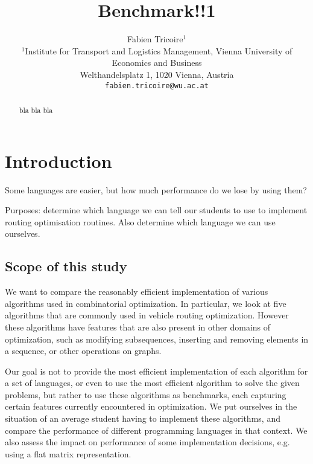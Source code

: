 \documentclass[11pt,a4paper,notitlepage]{article}
\begin{document}
\title{Benchmark!!1}
\author{
Fabien Tricoire$^{1}$ \\[1ex]
 \small $^1$Institute for Transport and Logistics Management,
 Vienna University of Economics and Business\\
 \small Welthandelsplatz 1, 1020 Vienna, Austria\\
  \small \texttt{fabien.tricoire@wu.ac.at}\\[2ex]
}
\date{}
\maketitle

\begin{abstract}
  bla bla bla
\end{abstract}

\section{Introduction}
\label{sec:intro}

Some languages are easier, but how much performance do we lose by
using them?

Purposes: determine which language we can tell our students to
use to implement routing optimisation routines. Also determine which
language we can use ourselves.

\subsection{Scope of this study}
We want to compare the reasonably efficient implementation of various
algorithms used in combinatorial optimization. In particular, we look
at five algorithms that are commonly used in vehicle routing
optimization. However these algorithms have features that are also
present in other domains of optimization, such as modifying
subsequences, inserting and removing elements in a sequence, or other
operations on graphs.

Our goal is not to provide the most efficient implementation of each
algorithm for a set of languages, or even to use the most efficient
algorithm to solve the given problems, but rather to use these
algorithms as benchmarks, each capturing certain features currently
encountered in optimization. We put ourselves in the situation of an
average student having to implement these algorithms, and compare the
performance of different programming languages in that context. We
also assess the impact on performance of some implementation
decisions, e.g. using a flat matrix representation.
\end{document}
